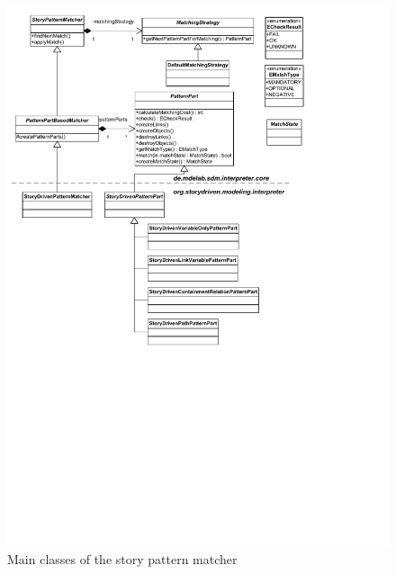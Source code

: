 \begin{figure}[htbp]
  \centering
  \includegraphics[width=1.0\columnwidth]{./figures/interpreter_storyPatternMatcher.pdf}
  \caption{Main classes of the story pattern matcher}
  \label{fig:interpreter_storyPatternMatcher}
\end{figure}

